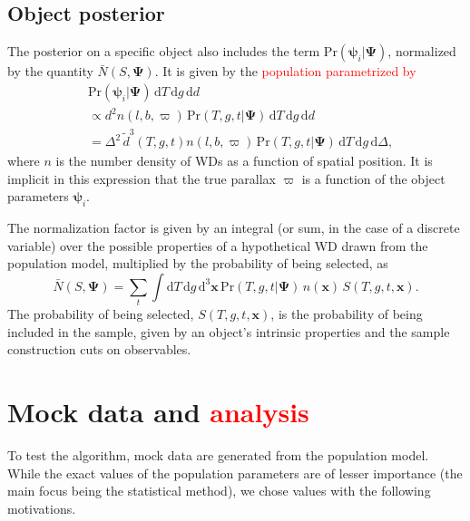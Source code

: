 \documentclass[fleqn,usenatbib]{mnras}
\newcommand{\changes}[1]{\textcolor{red}{#1}}
\newcommand{\popp}{\boldsymbol{\Psi}}
\newcommand{\objp}{\boldsymbol{\psi}}
\newcommand{\Teff}{T}
\newcommand{\logg}{g}
\newcommand{\pr}{\text{Pr}}
\newcommand{\de}{\text{d}}
\begin{document}
\subsection{Object posterior}\label{sec:objectposterior}

The posterior on a specific object also includes the term $\pr(\objp_i | \popp)$, normalized by the quantity $\bar{N}(S,\popp)$. It is given by the \changes{population parametrized by}
\begin{equation}
\begin{split}
	& \pr(\objp_i | \popp)\, \de \Teff\, \de \logg\, \de d  \\ & \propto
    d^2 n(l,b,\varpi)\, \pr(\Teff,g,t | \popp)\, \de \Teff\, \de \logg\, \de d \\
    & = \Delta^2\, \tilde{d}^3(\Teff,\logg,t) n(l,b,\varpi)\, \pr(\Teff,g,t | \popp)\, \de \Teff\, \de\logg\, \de \Delta,
\end{split}
\end{equation}
where $n$ is the number density of WDs as a function of spatial position. It is implicit in this expression that the true parallax $\varpi$ is a function of the object parameters $\objp_i$.

The normalization factor is given by an integral (or sum, in the case of a discrete variable) over the possible properties of a hypothetical WD drawn from the population model, multiplied by the probability of being selected, as
\begin{equation}\label{eq:normalization}
	\bar{N}(S,\popp) = \sum_{t} \int \de\Teff\, \de \logg\, \de^3\mathbf{x}\,
    \pr(\Teff,g,t | \popp)\, n(\mathbf{x})\, S(\Teff,\logg,t,\mathbf{x}).
\end{equation}
The probability of being selected, $S(\Teff,\logg,t,\mathbf{x})$, is the probability of being included in the sample, given by an object's intrinsic properties and the sample construction cuts on observables.







\section{Mock data and \changes{analysis}}\label{sec:mock}

To test the algorithm, mock data are generated from the population model. While the exact values of the population parameters are of lesser importance (the main focus being the statistical method), we chose values with the following motivations.
\end{document}
